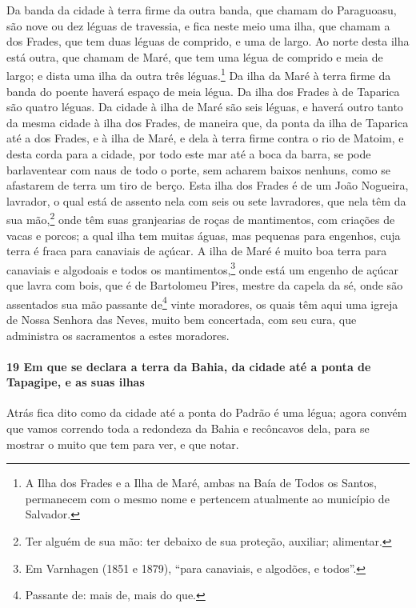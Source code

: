 Da banda da cidade à terra firme da outra banda, que chamam do Paraguoasu, são nove ou dez
léguas de travessia, e fica neste meio uma ilha, que chamam a dos Frades, que tem duas
léguas de comprido, e uma de largo. Ao norte desta ilha está outra, que chamam de Maré,
que tem uma légua de comprido e meia de largo; e dista uma ilha da outra três
léguas.\footnote{ A Ilha dos Frades e a Ilha de Maré, ambas na Baía de Todos os Santos,
permanecem com o mesmo nome e pertencem atualmente ao município de Salvador.} Da ilha da
Maré à terra firme da banda do poente haverá espaço de meia légua. Da ilha dos Frades à de
Taparica são quatro léguas. Da cidade à ilha de Maré são seis léguas, e haverá outro tanto
da mesma cidade à ilha dos Frades, de maneira que, da ponta da ilha de Taparica até a dos
Frades, e à ilha de Maré, e dela à terra firme contra o rio de Matoim, e desta corda para
a cidade, por todo este mar até a boca da barra, se pode barlaventear com naus de todo o
porte, sem acharem baixos nenhuns, como se afastarem de terra um tiro de berço. Esta ilha
dos Frades é de um João Nogueira, lavrador, o qual está de assento nela com seis ou sete
lavradores, que nela têm da sua mão,\footnote{ Ter alguém de sua mão: ter debaixo de sua
proteção, auxiliar; alimentar.} onde têm suas granjearias de roças de mantimentos, com
criações de vacas e porcos; a qual ilha tem muitas águas, mas pequenas para engenhos, cuja
terra é fraca para canaviais de açúcar. A ilha de Maré é muito boa terra para canaviais e
algodoais e todos os mantimentos,\footnote{ Em Varnhagen (1851 e 1879), ``para canaviais,
e algodões, e todos''.} onde está um engenho de açúcar que lavra com bois, que é de
Bartolomeu Pires, mestre da capela da sé, onde são assentados sua mão passante
de\footnote{ Passante de: mais de, mais do que.} vinte moradores, os quais têm aqui uma
igreja de Nossa Senhora das Neves, muito bem concertada, com seu cura, que administra os
sacramentos a estes moradores.

\paragraph{19 Em que se declara a terra da Bahia, da cidade até a ponta de Tapagipe, e as
suas ilhas}

Atrás fica dito como da cidade até a ponta do Padrão é uma légua; agora convém que vamos
correndo toda a redondeza da Bahia e recôncavos dela, para se mostrar o muito que tem para
ver, e que notar.

